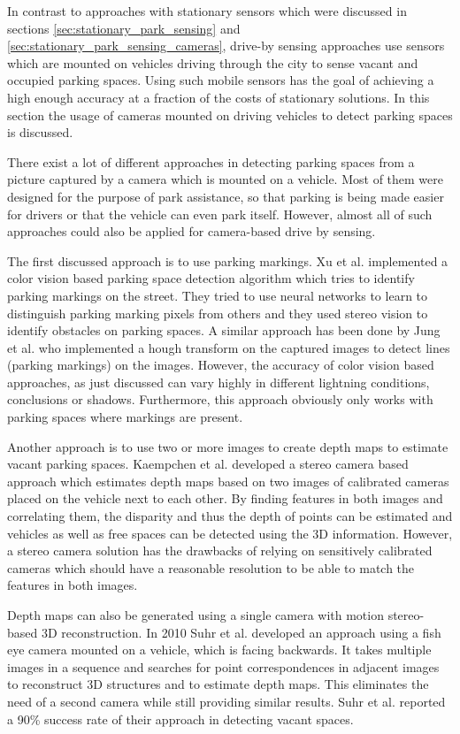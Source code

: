 In contrast to approaches with stationary sensors which were discussed in sections \ref{sec:stationary_park_sensing} and \ref{sec:stationary_park_sensing_cameras}, drive-by sensing approaches use sensors which are mounted on vehicles driving through the city to sense vacant and occupied parking spaces. Using such mobile sensors has the goal of achieving a high enough accuracy at a fraction of the costs of stationary solutions. In this section the usage of cameras mounted on driving vehicles to detect parking spaces is discussed.

There exist a lot of different approaches in detecting parking spaces from a picture captured by a camera which is mounted on a vehicle. Most of them were designed for the purpose of park assistance, so that parking is being made easier for drivers or that the vehicle can even park itself. However, almost all of such approaches could also be applied for camera-based drive by sensing. 

The first discussed approach is to use parking markings. Xu et al. \cite{Xu2000} implemented a color vision based parking space detection algorithm which tries to identify parking markings on the street. They tried to use neural networks to learn to distinguish parking marking pixels from others and they used stereo vision to identify obstacles on parking spaces. A similar approach has been done by Jung et al. \cite{Jung2006} who implemented a hough transform on the captured images to detect lines (parking markings) on the images. However, the accuracy of color vision based approaches, as just discussed can vary highly in different lightning conditions, conclusions or shadows. Furthermore, this approach obviously only works with parking spaces where markings are present.

Another approach is to use two or more images to create depth maps to estimate vacant parking spaces. Kaempchen et al. \cite{Kaempchen2002} developed a stereo camera based approach which estimates depth maps based on two images of calibrated cameras placed on the vehicle next to each other. By finding features in both images and correlating them, the disparity and thus the depth of points can be estimated and vehicles as well as free spaces can be detected using the 3D information. However, a stereo camera solution has the drawbacks of relying on sensitively calibrated cameras which should have a reasonable resolution to be able to match the features in both images.

Depth maps can also be generated using a single camera with motion stereo-based 3D reconstruction. In 2010 Suhr et al. \cite{Suhr2010} developed an approach using a fish eye camera mounted on a vehicle, which is facing backwards. It takes multiple images in a sequence and searches for point correspondences in adjacent images to reconstruct 3D structures and to estimate depth maps. This eliminates the need of a second camera while still providing similar results. Suhr et al. reported a 90\% success rate of their approach in detecting vacant spaces.


